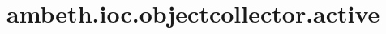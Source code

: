 \section{ambeth.ioc.objectcollector.active}
\label{configuration:AmbethIocObjectcollectorActive}
\TODO
